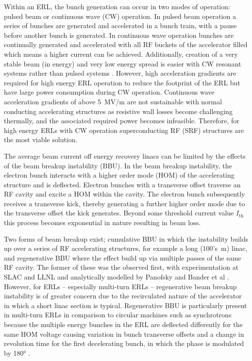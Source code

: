 \documentclass[../main.tex]{subfiles}
\begin{document}
Within an ERL, the bunch generation can occur in two modes of operation: pulsed beam or continuous wave (CW) operation. In pulsed beam operation a series of bunches are generated and accelerated in a bunch train, with a pause before another bunch is generated. In continuous wave operation bunches are continually generated and accelerated with all RF buckets of the accelerator filled which means a higher current can be achieved. Additionally,
creation of a very stable beam (in energy) and very low energy spread
is easier with CW resonant systems rather than pulsed systems \cite{reece2016continuous}. However, high acceleration gradients are required for high energy ERL operation to reduce the footprint of the ERL but have large power consumption during CW operation. Continuous wave acceleration gradients of above 5~\si{\mega\volt}/\si{\meter} are not sustainable with normal conducting accelerating structures \cite{reece2016continuous} as resistive wall losses become challenging thermally, and the associated required power becomes infeasible. Therefore, for high energy ERLs with CW operation superconducting RF (SRF) structures are the most viable solution. 

The average beam current off energy recovery linacs can be limited by the effects of the beam breakup instability (BBU). In the beam breakup instability, the electron bunch interacts with a higher order mode (HOM) of the accelerating structure and is deflected. Electron bunches with a transverse offset traverse an RF cavity and excite a HOM within the cavity. The electron bunch subsequently receives a transverse kick, thereby generating a further higher order mode due to the transverse offset the kick generates. Beyond some threshold current value $I_{\mathrm{th}}$ this process becomes exponential in nature resulting in beam loss.

Two forms of beam breakup exist; cumulative BBU in which the instability builds up over a series of RF accelerating structures, for example a long (100's~\si{\meter}) linac, and regenerative BBU where the effect build up via multiple passes of the same RF cavity. The former of these was the observed first, with experimentation at SLAC \cite{panofsky1966electrons,altenmueller1966beam} and LLNL \cite{neil1970coherent} and analytically modelled by Panofsky and Bander et al \cite{panofsky1968asymptotic}. However, for ERLs -- especially multi-turn ERLs -- regenerative beam breakup instability is of greater concern due to the recirculated nature of the accelerator in which a short linac section is typical. Regenerative BBU is particularly present in multi-turn ERLs in comparison to circular machines such as synchrotrons because the multiple energy bunches in the ERL are deflected differently for the same HOM voltage causing variation in bunch transverse offsets and a change in revolution time for the first decelerating bunch, in which the phase is modulated by 180\si{\degree} \cite{setiniyaz2021filling}.
\end{document}
